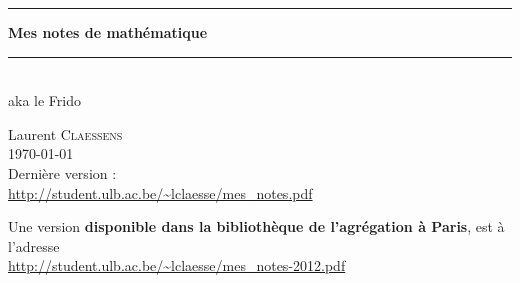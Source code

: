 
\thispagestyle{empty}
\begin{center}
  \begin{minipage}{15cm}
    \hrule\par
    \vspace{2mm}
    \begin{center}
    \Huge \bfseries Mes notes de mathématique \par
    \end{center}
    \hrule\par
  \end{minipage}\\
  \vspace{0.2cm}
  aka le Frido
\end{center}

\vspace{2cm}

\begin{center}
    Laurent \textsc{Claessens}\\
    \today\\

    Dernière version :\\
    \url{http://student.ulb.ac.be/~lclaesse/mes_notes.pdf}

    \vspace{1cm}

    Une version {\bf disponible dans la bibliothèque de l'agrégation à Paris}, est à l'adresse\\
    \url{http://student.ulb.ac.be/~lclaesse/mes_notes-2012.pdf}

\end{center}

\vfill

\LogoEtLicence



